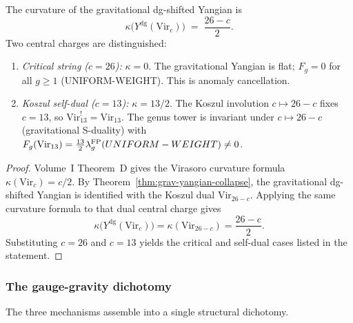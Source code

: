 \begin{proposition}
\label{prop:grav-yangian-curvature}
The curvature of the gravitational dg-shifted Yangian is
\begin{equation}\label{eq:grav-yangian-kappa}
\kappa\bigl(Y^{\mathrm{dg}}(\mathrm{Vir}_c)\bigr)
\;=\;
\frac{26 - c}{2}.
\end{equation}
Two central charges are distinguished:
\begin{enumerate}[label=\textup{(\roman*)}]
\item \emph{Critical string ($c = 26$):}\enspace
$\kappa = 0$. The gravitational Yangian is flat; $F_g = 0$ for all
$g \ge 1$ \textup{(UNIFORM-WEIGHT)}. This is anomaly cancellation.

\item \emph{Koszul self-dual ($c = 13$):}\enspace
$\kappa = 13/2$. The Koszul involution $c \mapsto 26-c$ fixes
$c = 13$, so $\mathrm{Vir}_{13}^! = \mathrm{Vir}_{13}$.
The genus tower is invariant under $c \mapsto 26 - c$
\textup{(}gravitational S-duality\textup{)} with
$F_g(\mathrm{Vir}_{13}) = \frac{13}{2}\lambda_g^{\mathrm{FP}}
\textup{(}UNIFORM-WEIGHT\textup{)}
\neq 0$.
\end{enumerate}
\end{proposition}

\begin{proof}
Volume~I Theorem~D gives the Virasoro curvature formula
$\kappa(\mathrm{Vir}_c)=c/2$.
By Theorem~\ref{thm:grav-yangian-collapse}, the gravitational
dg-shifted Yangian is identified with the Koszul dual
$\mathrm{Vir}_{26-c}$.
Applying the same curvature formula to that dual central charge gives
\[
\kappa\bigl(Y^{\mathrm{dg}}(\mathrm{Vir}_c)\bigr)
=\kappa(\mathrm{Vir}_{26-c})
=\frac{26-c}{2}.
\]
Substituting $c=26$ and $c=13$ yields the critical and self-dual cases
listed in the statement.
\end{proof}

\subsubsection*{The gauge-gravity dichotomy}

The three mechanisms assemble into a single structural dichotomy.


